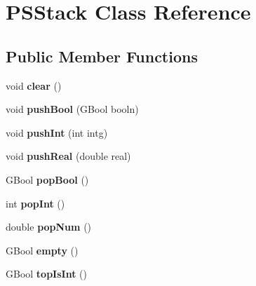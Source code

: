 \hypertarget{class_p_s_stack}{}\section{P\+S\+Stack Class Reference}
\label{class_p_s_stack}
\subsection*{Public Member Functions}
\begin{DoxyCompactItemize}
\item 
\mbox{\label{class_p_s_stack_a4367c550e3fd93d22cc764fab9764bd6}} 
void {\bfseries clear} ()
\item 
\mbox{\label{class_p_s_stack_abc7a3858f3535c5a37958f67cc193660}} 
void {\bfseries push\+Bool} (G\+Bool booln)
\item 
\mbox{\label{class_p_s_stack_a25799f0bcdd31177412c404927693f82}} 
void {\bfseries push\+Int} (int intg)
\item 
\mbox{\label{class_p_s_stack_a305124e4ec6d4232055b9e8ea7906ba2}} 
void {\bfseries push\+Real} (double real)
\item 
\mbox{\label{class_p_s_stack_a7cb912c6d2faca601d5f55051bab5c39}} 
G\+Bool {\bfseries pop\+Bool} ()
\item 
\mbox{\label{class_p_s_stack_af55c66eedadd26a47ac2850ebcc5489e}} 
int {\bfseries pop\+Int} ()
\item 
\mbox{\label{class_p_s_stack_a1c43cde81553e029551489a796f53b55}} 
double {\bfseries pop\+Num} ()
\item 
\mbox{\label{class_p_s_stack_a0491a803c24814cd96a6f6e75ed5a887}} 
G\+Bool {\bfseries empty} ()
\item 
\mbox{\label{class_p_s_stack_a5652075ac1b8c2cdd6fa1ff6ad8a34b2}} 
G\+Bool {\bfseries top\+Is\+Int} ()
\item 
\mbox{\label{class_p_s_stack_a8d410b5993ce03a1790132363c45fd76}} 

\end{DoxyCompactItemize}
